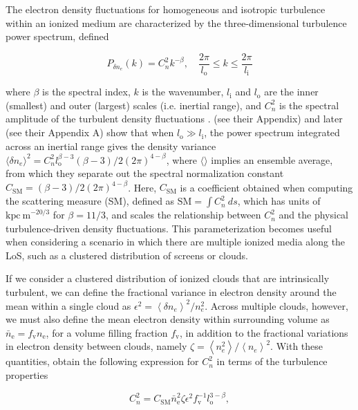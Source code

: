 \documentclass[twocolumn, linenumbers, tra]{aastex631}
\newcommand{\rev}[1]{{\color{purple}#1}}
\begin{document}
\rev{The electron density fluctuations for homogeneous and isotropic turbulence within an ionized medium are characterized by the three-dimensional turbulence power spectrum, defined

\begin{equation}\label{eq:powspec}
P_{\delta n_e}(k)=C_n^2 k^{-\beta}, \quad \frac{2 \pi}{l_\mathrm{o}} \leqslant k \leqslant \frac{2 \pi}{l_\mathrm{i}}
\end{equation}

\noindent
where $\beta$ is the spectral index, $k$ is the wavenumber, $l_\mathrm{i}$ and $l_\mathrm{o}$ are the inner (smallest) and outer (largest) scales (i.e. inertial range), and $C_n^2$ is the spectral amplitude of the turbulent density fluctuations \citep{Cordes1991}. \citet{Cordes2022} (see their Appendix) and later \citet{Ocker2025} (see their Appendix A) show that when $l_\mathrm{o} \gg l_\mathrm{i}$, the power spectrum integrated across an inertial range gives the density variance $\langle \delta n_e \rangle^2 = C_n^2 l_{\mathrm{o}}^{\beta-3} (\beta-3) / 2(2 \pi)^{4-\beta}$, where $\langle \rangle$ implies an ensemble average, from which they separate out the spectral normalization constant $C_{\mathrm{SM}}=(\beta-3) / 2(2 \pi)^{4-\beta}$. Here, $C_{\mathrm{SM}}$ is a coefficient obtained when computing the scattering measure (SM), defined as $\mathrm{SM}=\int C_n^2\ ds$, which has units of $\mathrm{kpc\ m}^{-20/3}$ for $\beta = 11/3$, and scales the relationship between $C_n^2$ and the physical turbulence-driven density fluctuations. This parameterization becomes useful when considering a scenario in which there are multiple ionized media along the LoS, such as a clustered distribution of screens or clouds. 

If we consider a clustered distribution of ionized clouds that are intrinsically turbulent, we can define the fractional variance in electron density around the mean within a single cloud as $\epsilon^2=\left\langle\delta n_{e}\right\rangle^2 / n_{e}^2$. Across multiple clouds, however, we must also define the mean electron density within surrounding volume as $\bar{n}_{\mathrm{e}}=f_{\mathrm{v}} n_{\mathrm{e}}$, for a volume filling fraction $f_{\mathrm{v}}$, in addition to the fractional variations in electron density between clouds, namely $\zeta=\left\langle n_{e}^2\right\rangle /\left\langle n_{e}\right\rangle^2$. With these quantities, \citet{Cordes2022} obtain the following expression for $C_n^2$ in terms of the turbulence properties

\begin{equation}\label{eq:cn2}
C_n^2=C_{\mathrm{SM}} \bar{n}_{\mathrm{e}}^2 \zeta \epsilon^2 f_{\mathrm{v}}^{-1} l_\mathrm{o}^{3-\beta},
\end{equation}

}
\end{document}
